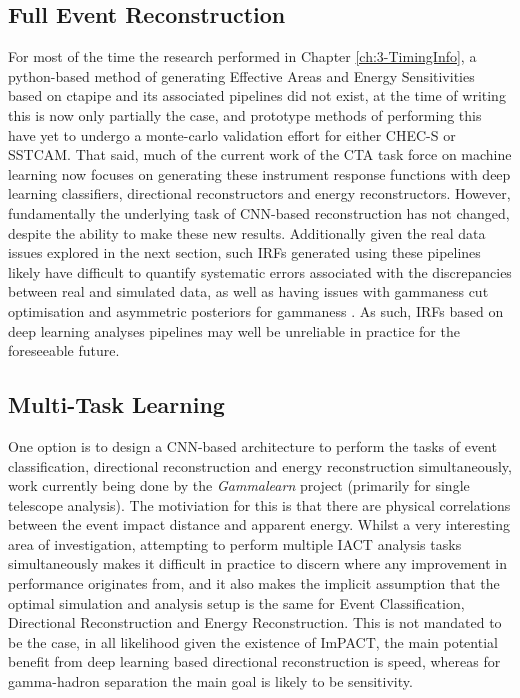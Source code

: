 \subsection{Full Event Reconstruction}
For most of the time the research performed in Chapter \ref{ch:3-TimingInfo}, a python-based method of generating Effective Areas and Energy Sensitivities based on ctapipe and its associated pipelines did not exist, at the time of writing this is now only partially the case, and prototype methods of performing this have yet to undergo a monte-carlo validation effort for either CHEC-S or SSTCAM. That said, much of the current work of the CTA task force on machine learning now focuses on generating these instrument response functions with deep learning classifiers, directional reconstructors and energy reconstructors. However, fundamentally the underlying task of CNN-based reconstruction has not changed, despite the ability to make these new results. Additionally given the real data issues explored in the next section, such IRFs generated using these pipelines likely have difficult to quantify systematic errors associated with the discrepancies between real and simulated data, as well as having issues with gammaness cut optimisation and asymmetric posteriors for gammaness \cite{mike}. As such, IRFs based on deep learning analyses pipelines may well be unreliable in practice for the foreseeable future.

\subsection{Multi-Task Learning}

One option is to design a CNN-based architecture to perform the tasks of event classification, directional reconstruction and energy reconstruction simultaneously, work currently being done by the \textit{Gammalearn} project \cite{mikaelphd} (primarily for single telescope analysis). The motiviation for this is that there are physical correlations between the event impact distance and apparent energy. Whilst a very interesting area of investigation, attempting to perform multiple IACT analysis tasks simultaneously makes it difficult in practice to discern where any improvement in performance originates from, and it also makes the implicit assumption that the optimal simulation and analysis setup is the same for Event Classification, Directional Reconstruction and Energy Reconstruction. This is not mandated to be the case, in all likelihood given the existence of ImPACT, the main potential benefit from deep learning based directional reconstruction is speed, whereas for gamma-hadron separation the main goal is likely to be sensitivity.

